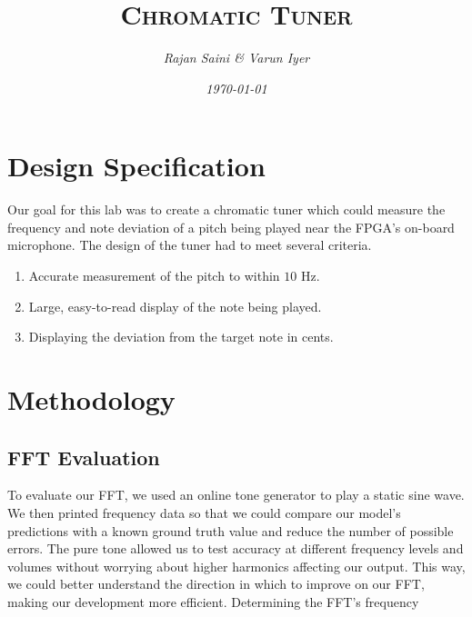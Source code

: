 \documentclass{article}
\title{\textsc{Chromatic Tuner}}
\author{\textit{Rajan Saini \& Varun Iyer}}
\date{\textit{\today}}
\begin{document}
\maketitle
\section{Design Specification}
Our goal for this lab was to create a chromatic tuner which could measure the frequency and note deviation of a pitch being played near the FPGA’s on-board microphone. The design of the tuner had to meet several criteria.
\begin{enumerate}
	\item Accurate measurement of the pitch to within $10$ Hz.
	\item Large, easy-to-read display of the note being played.
	\item Displaying the deviation from the target note in cents.
\end{enumerate}
\section{Methodology}
\subsection{FFT Evaluation}
To evaluate our FFT, we used an online tone generator to play a static sine wave. We then printed frequency data so that we could compare our model's predictions with a known ground truth value and reduce the number of possible errors. The pure tone allowed us to test accuracy at different frequency levels and volumes without worrying about higher harmonics affecting our output. This way, we could better understand the direction in which to improve on our FFT, making our development more efficient. Determining the FFT's frequency 
\end{document}
